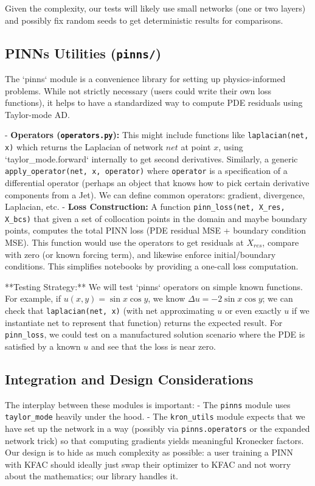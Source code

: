 \documentclass[11pt]{article}
\begin{document}
Given the complexity, our tests will likely use small networks (one or two layers) and possibly fix random seeds to get deterministic results for comparisons.

\subsection{PINNs Utilities (\texttt{pinns/})}

The `pinns` module is a convenience library for setting up physics-informed problems. While not strictly necessary (users could write their own loss functions), it helps to have a standardized way to compute PDE residuals using Taylor-mode AD.

- \textbf{Operators (\texttt{operators.py}):} This might include functions like \texttt{laplacian(net, x)} which returns the Laplacian of network $net$ at point $x$, using `taylor_mode.forward` internally to get second derivatives. Similarly, a generic \texttt{apply\_operator(net, x, operator)} where \texttt{operator} is a specification of a differential operator (perhaps an object that knows how to pick certain derivative components from a Jet). We can define common operators: gradient, divergence, Laplacian, etc.
- \textbf{Loss Construction:} A function \texttt{pinn\_loss(net, X\_res, X\_bcs)} that given a set of collocation points in the domain and maybe boundary points, computes the total PINN loss (PDE residual MSE + boundary condition MSE). This function would use the operators to get residuals at $X_{res}$, compare with zero (or known forcing term), and likewise enforce initial/boundary conditions. This simplifies notebooks by providing a one-call loss computation.

**Testing Strategy:** We will test `pinns` operators on simple known functions. For example, if $u(x,y) = \sin x \cos y$, we know $\Delta u = -2 \sin x \cos y$; we can check that \texttt{laplacian(net, x)} (with net approximating $u$ or even exactly $u$ if we instantiate net to represent that function) returns the expected result. For \texttt{pinn\_loss}, we could test on a manufactured solution scenario where the PDE is satisfied by a known $u$ and see that the loss is near zero.

\subsection{Integration and Design Considerations}

The interplay between these modules is important:
- The \texttt{pinns} module uses \texttt{taylor\_mode} heavily under the hood.
- The \texttt{kron\_utils} module expects that we have set up the network in a way (possibly via \texttt{pinns.operators} or the expanded network trick) so that computing gradients yields meaningful Kronecker factors. Our design is to hide as much complexity as possible: a user training a PINN with KFAC should ideally just swap their optimizer to KFAC and not worry about the mathematics; our library handles it.
\end{document}
